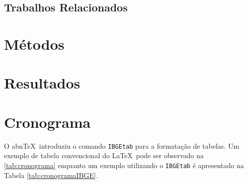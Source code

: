 \documentclass[
	12pt,				    %
	openright,			    %
	oneside,			    %
	a4paper,			    %
    sumario=tradicional,    %
	english,			    %
	brazil,				    %
	]{abntex2}
\begin{document}
\section{Trabalhos Relacionados}\label{sec:TrabRel}

\chapter{Métodos}\label{sec:metodos}\thispagestyle{empty}

\chapter{Resultados}\label{sec:resultados}\thispagestyle{empty}

\chapter{Cronograma}\label{sec:cronograma}\thispagestyle{empty}
O abn\TeX\ introduziu o comando \texttt{IBGEtab} para a formatação de tabelas. Um exemplo de tabela convencional do \LaTeX\ pode ser observado na \autoref{tab:cronograma} enquanto um exemplo utilizando o \texttt{IBGEtab} é apresentado na Tabela \ref{tab:cronogramaIBGE}.
\end{document}
